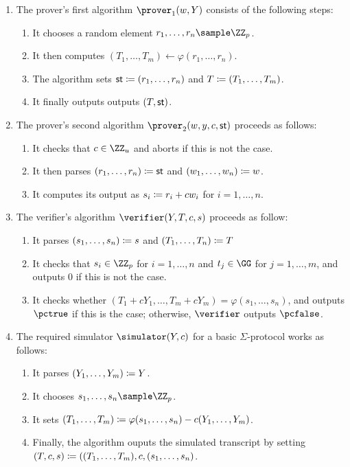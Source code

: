 \documentclass[runningheads]{llncs}
\begin{document}
\begin{enumerate}
  \item\label{item:basic:p1}
    The prover's first algorithm $\prover_1(w,Y)$ consists of the following steps:
    \begin{enumerate}
      \item\label{item:basic:p1:randomness}
        It chooses a random element $r_1,\dots,r_n\sample\ZZ_p$.
      \item
        It then computes $(T_1,\dots,T_m)\gets\varphi(r_1,\dots,r_n)$.
      \item
	The algorithm sets $\mathsf{st}\coloneqq (r_1,\dots,r_n)$ and $T\coloneqq(T_1,\dots,T_m)$.
      \item
        It finally outputs outputs $(T,\mathsf{st})$.
    \end{enumerate}
  \item\label{item:basic:p2}
    The prover's second algorithm $\prover_2(w,y,c,\st)$ proceeds as follows:
    \begin{enumerate}
      \item
        It checks that $c\in\ZZ_u$ and aborts if this is not the case.
      \item
	It then parses $(r_1,\dots,r_n)\coloneqq \mathsf{st}$ and $(w_1,\dots,w_n)\coloneqq w$.
      \item
        It computes its output as $s_i\coloneqq r_i+cw_i$ for $i=1,\dots,n$.
    \end{enumerate}
  \item\label{item:basic:v}
    The verifier's algorithm $\verifier(Y,T,c,s)$ proceeds as follow:
    \begin{enumerate}
      \item It parses $(s_1, \dots, s_n) \coloneqq s$ and $(T_1, \dots, T_n) \coloneqq T$
      \item\label{item:basic:v:checks}
        It checks that $s_i\in\ZZ_p$ for $i=1,\dots,n$ and $t_j\in\GG$ for $j=1,\dots,m$, and outputs $0$ if this is not the case.
      \item
	It checks whether $(T_1 + cY_1,\dots,T_m + cY_m) = \varphi(s_1,\dots,s_n)$, and outputs $\accept$ if this is the case; otherwise, $\verifier$ outputs $\reject$.
    \end{enumerate}
  \item\label{item:basic:sim}
    The required simulator $\simulator(Y,c)$ for a basic $\Sigma$-protocol works as follows:
    \begin{enumerate}
      \item
        It parses $(Y_1,\dots,Y_m)\coloneqq Y$.
      \item\label{item:basic:sim:s}
        It chooses $s_1,\dots,s_n\sample\ZZ_p$.
      \item
        It sets $(T_1,\dots,T_m) \coloneqq \varphi(s_1,\dots,s_n) - c(Y_1,\dots,Y_m)$.
      \item
        Finally, the algorithm ouputs the simulated transcript by setting $(T,c,s)\coloneqq((T_1,\dots,T_m),c,(s_1,\dots,s_n)$.
    \end{enumerate}
\end{enumerate}
\end{document}
